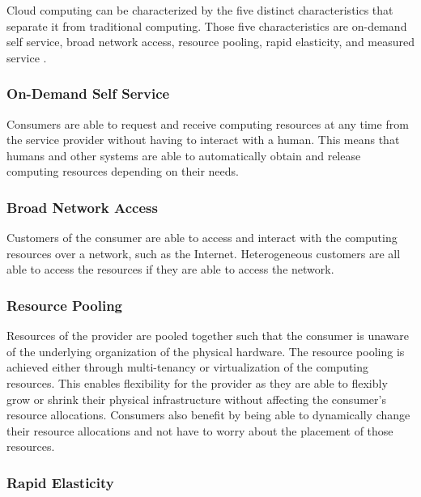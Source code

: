 \documentclass[12pt]{article}
\begin{document}
Cloud computing can be characterized by the five distinct characteristics that separate it from traditional computing. Those five characteristics are on-demand self service, broad network access, resource pooling, rapid elasticity, and measured service \cite{alam2015comprehensive, dillon2010cloud}.

\subsubsection{On-Demand Self Service} \label{ssub:on-demand}

Consumers are able to request and receive computing resources at any time from the service provider without having to interact with a human. This means that humans and other systems are able to automatically obtain and release computing resources depending on their needs.


\subsubsection{Broad Network Access} \label{ssub:net-access}

Customers of the consumer are able to access and interact with the computing resources over a network, such as the Internet. Heterogeneous customers are all able to access the resources if they are able to access the network.


\subsubsection{Resource Pooling} \label{ssub:resource-pooling}

Resources of the provider are pooled together such that the consumer is unaware of the underlying organization of the physical hardware. The resource pooling is achieved either through multi-tenancy or virtualization of the computing resources. This enables flexibility for the provider as they are able to flexibly grow or shrink their physical infrastructure without affecting the consumer's resource allocations. Consumers also benefit by being able to dynamically change their resource allocations and not have to worry about the placement of those resources.


\subsubsection{Rapid Elasticity} \label{ssub:elasticity}
\end{document}
